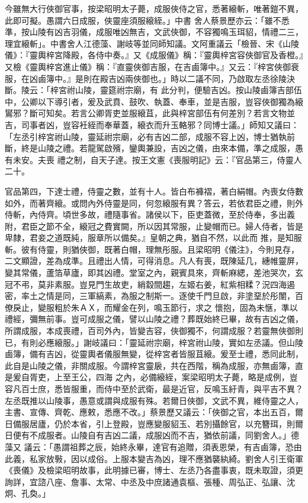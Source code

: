 \begin{pinyinscope}
 今雖無大行俠御官事，按梁昭明太子薨，成服俠侍之官，悉著縗斬，唯著鎧不異，此即可擬。愚謂六日成服，俠靈座須服縗絰。」中書
 舍人蔡景歷亦云：「雖不悉準，按山陵有凶吉羽儀，成服唯凶無吉，文武俠御，不容獨鳴玉珥貂，情禮二三，理宜縗斬」。中書舍人江德藻、謝岐等並同師知議。文阿重議云「檢晉、宋《山陵儀》：『靈輿梓宮降殿，各侍中奏。』又《成服儀》稱：『靈輿梓宮容俠御官及香橙。』又檢《靈輿梓宮進止儀》稱：『直靈俠御吉服，在吉鹵簿中。』又云：『梓宮俠御衰服，在凶鹵簿中。』是則在殿吉凶兩俠御也。」時以二議不同，乃啟取左丞徐陵決斷。陵云：「梓宮祔山陵，靈筵祔宗廟，有
 此分判，便驗吉凶。按山陵鹵簿吉部伍中，公卿以下導引者，爰及武賁、鼓吹、執蓋、奉車，並是吉服，豈容俠御獨為縗鸑邪？斷可知矣。若言公卿胥吏並服縗苴，此與梓宮部伍有何差別？若言文物並吉，司事者凶，豈容衽絰而奉華蓋，縗衣而升玉輅邪？同博士議。」師知又議曰：「左丞引梓宮祔山陵，靈延祔宗廟，必有吉凶二部，成服不容上凶，博士猶執前斷，終是山陵之禮。若龍駕啟殯，鑾輿兼設，吉凶之儀，由來本備，準之成服，愚有未安。夫喪
 禮之制，自天子達。按王文憲《喪服明記》云：『官品第三，侍靈人二十。



 官品第四，下達士禮，侍靈之數，並有十人。皆白布褲褶，著白絹帽。內喪女侍數如外，而著齊縗。或問內外侍靈是同，何忽縗服有異？答云，若依君臣之禮，則外侍斬，內侍齊。頃世多故，禮隨事省。諸侯以下，臣吏蓋微，至於侍奉，多出義附，君臣之節不全，縗冠之費實闕，所以因其常服，止變帽而已。婦人侍者，皆是卑隸，君妾之道既純，服章所以備矣。』皇朝之典，猶自不然，以此而
 推，是知服斬。彼有侍靈，則猶俠御，既著白帽，理無彤服。且梁昭明《儀注》，今則見存，二文顯證，差為成準。且禮出人情，可得消息。凡人有喪，既陳延几，繐帷靈屏，變其常儀，蘆箔草廬，即其凶禮。堂室之內，親賓具來，齊斬麻緦，差池哭次，玄冠不弔，莫非素服。豈見門生故吏，綃縠間趨，左姬右姜，紅紫相糅？況四海遏密，率土之情是同，三軍縞素，為服之制斯一。逐使千門旦啟，非塗堊於彤闈，百僚戾止，變服粗於朱ＡＸ，而耀金在列，鳴玉節行，求之
 懷抱，固為未愜，準以禮經，彌無前事。豈可成服之儀，譬以山陵之禮？葬既始終已畢，故有吉凶之儀，所謂成服，本成喪禮，百司外內，皆變吉容，俠御獨不，何謂成服？若靈無俠御則已，有則必應縗服。」謝岐議曰：「靈延祔宗廟，梓宮祔山陵，實如左丞議。但山陵鹵簿，備有吉凶，從靈輿者儀服無變，從梓宮者皆服苴縗。爰至士禮，悉同此制，此自是山陵之儀，非關成服。今謂梓宮靈扆，共在西階，稱為成服，亦無鹵簿，直是爰自胥吏，上至王公，四海
 之內，必備縗絰，案梁昭明太子薨，略是成例，豈容凡百士庶，悉皆服重，而侍中至於武衛，最是近官，反鳴玉紆青，與平吉不異？左丞既推以山陵事，愚意或謂與成服有殊。若爾日俠御，文武不異，維侍靈之人，主書、宣傳、齊乾、應敕，悉應不改。」蔡景歷又議云：「俠御之官，本出五百，爾日備服居廬，仍於本省，引上登殿，豈應變服貂玉、若別攝餘官，以充簪珥，則爾日便有不成服者。山陵自有吉凶二議，成服凶而不吉，猶依前議，同劉舍人。」德藻又
 議云：「愚謂祖葬之辰，始終永畢，達官有追贈，須表恩榮，有吉鹵簿，恐由此義，私家放斅，因以成俗。上服本變吉為凶，理不應猶襲紈綺。劉舍人引王衛軍《喪儀》及檢梁昭明故事，此明據已審，博士、左丞乃各盡事衷，既未取證，須更詢詳，宜諮八座、詹事、太常、中丞及中庶諸通袁樞、張種、周弘正、弘讓、沈炯、孔奐。」




\end{pinyinscope}
